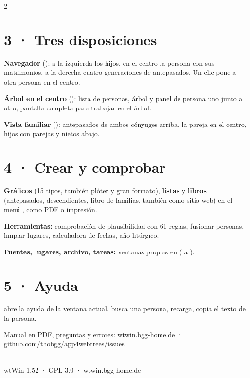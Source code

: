 \documentclass[a4paper, 9.5pt, parskip=half]{scrartcl}
\begin{document}
\begin{multicols}{2}
\section*{3 · Tres disposiciones}
\textbf{Navegador} (): a la izquierda los hijos, en el centro la persona con sus matrimonios, a la derecha cuatro generaciones de antepasados. Un clic pone a otra persona en el centro.

\textbf{Árbol en el centro} (): lista de personas, árbol y panel de persona uno junto a otro; pantalla completa para trabajar en el árbol.

\textbf{Vista familiar} (): antepasados de ambos cónyuges arriba, la pareja en el centro, hijos con parejas y nietos abajo.
\section*{4 · Crear y comprobar}
\textbf{Gráficos} (15 tipos, también plóter y gran formato), \textbf{listas} y \textbf{libros} (antepasados, descendientes, libro de familias, también como sitio web) en el menú , como PDF o impresión.

\textbf{Herramientas:} comprobación de plausibilidad con 61 reglas, fusionar personas, limpiar lugares, calculadora de fechas, año litúrgico.

\textbf{Fuentes, lugares, archivo, tareas:} ventanas propias en  ( a ).
\section*{5 · Ayuda}
 abre la ayuda de la ventana actual.  busca una persona,  recarga,  copia el texto de la persona.

Manual en PDF, preguntas y errores: \href{https://wtwin.bgg-home.de}{wtwin.bgg-home.de} · \href{https://github.com/thobgg/app4webtrees/issues}{github.com/thobgg/app4webtrees/issues}
\vspace{3mm}
\noindent{}
\end{multicols}
\vspace{2mm}
\noindent{\color{wtLinie}\rule{\linewidth}{0.5pt}}\\[2pt]
{\sffamily\footnotesize\color{wtGrau}wtWin 1.52 · GPL-3.0 · wtwin.bgg-home.de}
\end{document}
